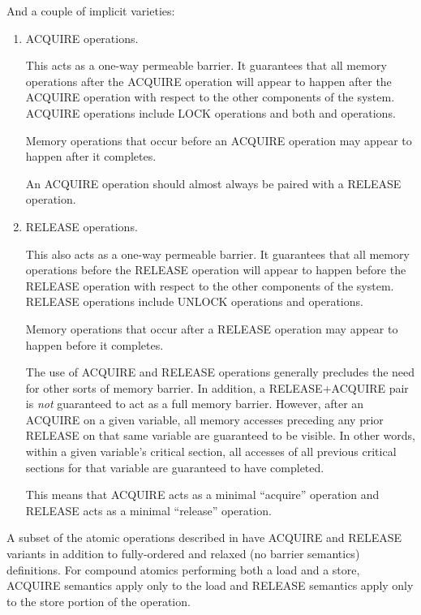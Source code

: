And a couple of implicit varieties:

\begin{enumerate}[resume]
 \item
     ACQUIRE operations.

     This acts as a one-way permeable barrier.
     It guarantees that all memory operations after the ACQUIRE operation
     will appear to happen after the ACQUIRE operation with respect to the
     other components of the system.
     ACQUIRE operations include LOCK operations and both 
     and  operations.

     Memory operations that occur before an ACQUIRE operation may appear to
     happen after it completes.

     An ACQUIRE operation should almost always be paired with a RELEASE
     operation.


 \item
     RELEASE operations.

     This also acts as a one-way permeable barrier.
     It guarantees that all memory operations before the RELEASE operation
     will appear to happen before the RELEASE operation with respect to
     the other components of the system.
     RELEASE operations include UNLOCK operations and 
     operations.

     Memory operations that occur after a RELEASE operation may appear to
     happen before it completes.

     The use of ACQUIRE and RELEASE operations generally precludes the need
     for other sorts of memory barrier.
     In addition, a RELEASE+ACQUIRE pair is \emph{not} guaranteed to act
     as a full memory barrier.
     However, after an ACQUIRE on a given variable, all memory accesses
     preceding any prior RELEASE on that same variable are guaranteed to
     be visible.
     In other words, within a given variable's critical section, all
     accesses of all previous critical sections for that variable are
     guaranteed to have completed.

     This means that ACQUIRE acts as a minimal ``acquire'' operation and
     RELEASE acts as a minimal ``release'' operation.
\end{enumerate}

A subset of the atomic operations described in  have
ACQUIRE and RELEASE variants in addition to fully-ordered and relaxed
(no barrier semantics) definitions.
For compound atomics performing both a load and a store, ACQUIRE semantics
apply only to the load and RELEASE semantics apply only to the store portion
of the operation.

